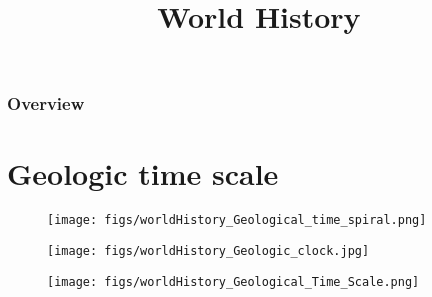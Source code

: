 



\title{World History}
\begin{frame}[plain]\logoTree
	\institute{}
	\titlepage
\end{frame}


\begin{frame}\frametitle{Overview}\tiny
	\tableofcontents
\end{frame}

\section{Geologic time scale}
\begin{frame}[plain]\mypagenum
	\begin{changemargin}{-1.3in}{0in}
		\begin{figure}
			\texttt{[image: figs/worldHistory\_Geological\_time\_spiral.png]}
		\end{figure}
	\end{changemargin}
\end{frame}



\begin{frame}[plain]\mypagenum
	\begin{changemargin}{-1.3in}{0in}
		\begin{figure}
			\texttt{[image: figs/worldHistory\_Geologic\_clock.jpg]}
		\end{figure}
	\end{changemargin}
\end{frame}



\begin{frame}[plain]\mypagenum
	\begin{changemargin}{-1.3in}{0in}
		\begin{figure}
			\texttt{[image: figs/worldHistory\_Geological\_Time\_Scale.png]}
		\end{figure}
	\end{changemargin}
\end{frame}


